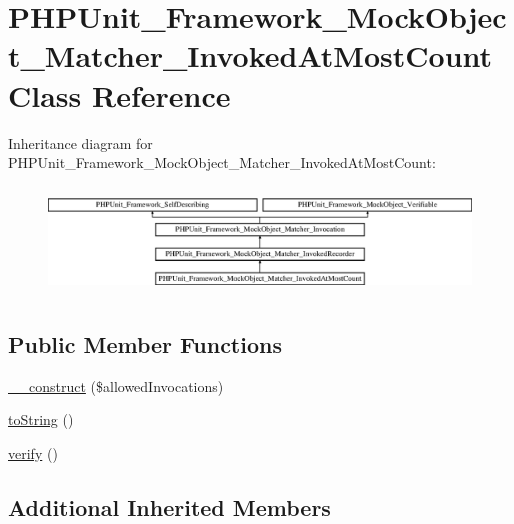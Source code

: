 \hypertarget{class_p_h_p_unit___framework___mock_object___matcher___invoked_at_most_count}{}\section{P\+H\+P\+Unit\+\_\+\+Framework\+\_\+\+Mock\+Object\+\_\+\+Matcher\+\_\+\+Invoked\+At\+Most\+Count Class Reference}
\label{class_p_h_p_unit___framework___mock_object___matcher___invoked_at_most_count}
Inheritance diagram for P\+H\+P\+Unit\+\_\+\+Framework\+\_\+\+Mock\+Object\+\_\+\+Matcher\+\_\+\+Invoked\+At\+Most\+Count\+:\begin{figure}[H]
\begin{center}
\leavevmode
\includegraphics[height=2.886598cm]{class_p_h_p_unit___framework___mock_object___matcher___invoked_at_most_count}
\end{center}
\end{figure}
\subsection*{Public Member Functions}
\begin{DoxyCompactItemize}
\item 
\mbox{\hyperlink{class_p_h_p_unit___framework___mock_object___matcher___invoked_at_most_count_a23254e207d2be3e32a6c6cbbaa111c81}{\+\_\+\+\_\+construct}} (\$allowed\+Invocations)
\item 
\mbox{\hyperlink{class_p_h_p_unit___framework___mock_object___matcher___invoked_at_most_count_a5558c5d549f41597377fa1ea8a1cefa3}{to\+String}} ()
\item 
\mbox{\hyperlink{class_p_h_p_unit___framework___mock_object___matcher___invoked_at_most_count_aa33600b6a1b28d0c4dfe4d468272aaa4}{verify}} ()
\end{DoxyCompactItemize}
\subsection*{Additional Inherited Members}


